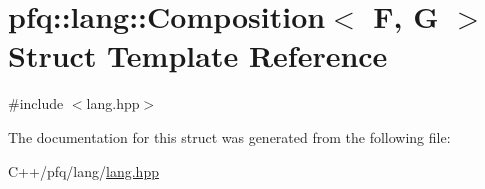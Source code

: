 \hypertarget{structpfq_1_1lang_1_1Composition}{\section{pfq\+:\+:lang\+:\+:Composition$<$ F, G $>$ Struct Template Reference}
\label{structpfq_1_1lang_1_1Composition}
}


{\ttfamily \#include $<$lang.\+hpp$>$}



The documentation for this struct was generated from the following file\+:\begin{DoxyCompactItemize}
\item 
C++/pfq/lang/\hyperlink{lang_8hpp}{lang.\+hpp}\end{DoxyCompactItemize}
